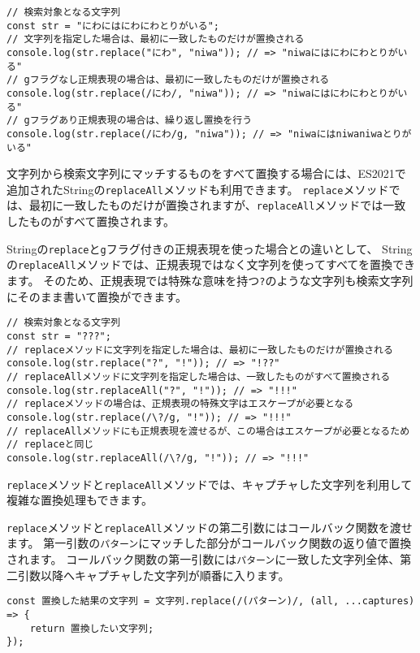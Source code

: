 \begin{lstlisting}
// 検索対象となる文字列
const str = "にわにはにわにわとりがいる";
// 文字列を指定した場合は、最初に一致したものだけが置換される
console.log(str.replace("にわ", "niwa")); // => "niwaにはにわにわとりがいる"
// gフラグなし正規表現の場合は、最初に一致したものだけが置換される
console.log(str.replace(/にわ/, "niwa")); // => "niwaにはにわにわとりがいる"
// gフラグあり正規表現の場合は、繰り返し置換を行う
console.log(str.replace(/にわ/g, "niwa")); // => "niwaにはniwaniwaとりがいる"
\end{lstlisting}

文字列から検索文字列にマッチするものをすべて置換する場合には、ES2021で追加されたStringの\texttt{replaceAll}メソッドも利用できます。
\texttt{replace}メソッドでは、最初に一致したものだけが置換されますが、\texttt{replaceAll}メソッドでは一致したものがすべて置換されます。

Stringの\texttt{replace}と\texttt{g}フラグ付きの正規表現を使った場合との違いとして、
Stringの\texttt{replaceAll}メソッドでは、正規表現ではなく文字列を使ってすべてを置換できます。
そのため、正規表現では特殊な意味を持つ\texttt{?}のような文字列も検索文字列にそのまま書いて置換ができます。

\begin{lstlisting}
// 検索対象となる文字列
const str = "???";
// replaceメソッドに文字列を指定した場合は、最初に一致したものだけが置換される
console.log(str.replace("?", "!")); // => "!??"
// replaceAllメソッドに文字列を指定した場合は、一致したものがすべて置換される
console.log(str.replaceAll("?", "!")); // => "!!!"
// replaceメソッドの場合は、正規表現の特殊文字はエスケープが必要となる
console.log(str.replace(/\?/g, "!")); // => "!!!"
// replaceAllメソッドにも正規表現を渡せるが、この場合はエスケープが必要となるため
// replaceと同じ
console.log(str.replaceAll(/\?/g, "!")); // => "!!!"
\end{lstlisting}

\texttt{replace}メソッドと\texttt{replaceAll}メソッドでは、キャプチャした文字列を利用して複雑な置換処理もできます。

\texttt{replace}メソッドと\texttt{replaceAll}メソッドの第二引数にはコールバック関数を渡せます。
第一引数の\texttt{パターン}にマッチした部分がコールバック関数の返り値で置換されます。
コールバック関数の第一引数には\texttt{パターン}に一致した文字列全体、第二引数以降へキャプチャした文字列が順番に入ります。

\begin{lstlisting}
const 置換した結果の文字列 = 文字列.replace(/(パターン)/, (all, ...captures) => {
    return 置換したい文字列;
});
\end{lstlisting}

